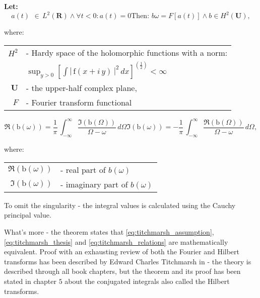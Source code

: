 \documentclass[12pt,twoside,a4paper]{article}
\numberwithin{equation}{subsection}
\numberwithin{figure}{subsection}
\begin{document}
\textbf{Let:}
\begin{subequations}  \label{eq:titchmarsh_theorem}
 \begin{equation}  \label{eq:titchmarsh_assumption}
   a(t)\,\ \in \,L^{2}(\mathbf{R}) \wedge \forall t < 0 : a(t) = 0
  \end{equation}
  \begin{equation} \label{eq:titchmarsh_thesis}
    \mbox{Then: }  b{\omega} = F[a(t)] \wedge b \in H^2(\textbf{U}),
  \end{equation}
\end{subequations}

where:

\begin{tabular} {r l}
  $H^{2}$ & - Hardy space of the holomorphic functions with a norm: \\
  \, & $\sup_{y > 0} [\int  \left|  \! \,\mathrm{f}(x + i\,y)\, \!  \right| ^{2}\,dx] ^{(\frac {1}{2})} < \infty$ \\
  $\mathbf{U}$ & - the upper-half complex plane, \\
  $F$ & - Fourier transform functional \\
\end{tabular} 

\begin{subequations}  \label{eq:titchmarsh_relations}
  \begin{equation}  \label{eq:titchmarsh_real}
    \Re (\mathrm{b}(\omega )) =  \frac{1}{\pi}\,\int_{ -\infty }^{\infty }
    \frac {\Im (\mathrm{b}(\Omega ))}{\Omega - \omega }\,d\Omega 
  \end{equation}
  \begin{equation} \label{eq:titchmarsh_imag}
    \Im (\mathrm{b}(\omega )) = -\frac{1}{\pi}\,\int_{ -\infty}^{\infty }
    \frac {\Re (\mathrm{b}(\Omega ))}{\Omega - \omega }\,d\Omega,
  \end{equation}
\end{subequations}

where:

\begin{tabular} {r l}
  $\Re (\mathrm{b}(\omega ))$ & - real part of $b(\omega)$ \\
  $\Im (\mathrm{b}(\omega ))$ & - imaginary part of $b(\omega)$ \\
\end{tabular}


To omit the singularity - the integral values is calculated using the Cauchy principal value.

What's more - the theorem states that \ref{eq:titchmarsh_assumption}, \ref{eq:titchmarsh_thesis} and \ref{eq:titchmarsh_relations}
are mathematically equivalent. Proof with an exhausting review of both the Fourier and Hilbert transforms has been described by Edward
Charles Titchmarsh in \cite{titchmarsh_introduction} - the theory is described through all book
chapters, but the theorem and its proof has been stated in chapter $5$ about the conjugated integrals also called the Hilbert transforms.
\end{document}
